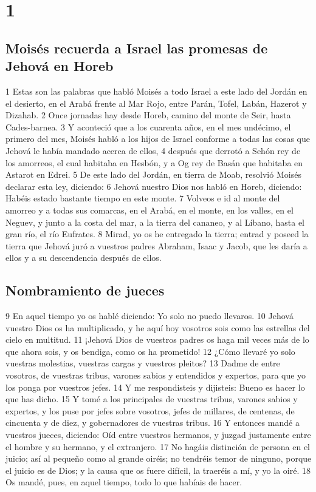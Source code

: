 
\chapter{1}




\section{Moisés recuerda a Israel las promesas de Jehová en Horeb}

1 Estas son las palabras que habló Moisés a todo Israel a este lado del Jordán en el desierto, en el Arabá frente al Mar Rojo, entre Parán, Tofel, Labán, Hazerot y Dizahab.
2 Once jornadas hay desde Horeb, camino del monte de Seir, hasta Cades-barnea.
3 Y aconteció que a los cuarenta años, en el mes undécimo, el primero del mes, Moisés habló a los hijos de Israel conforme a todas las cosas que Jehová le había mandado acerca de ellos,
4 después que derrotó a Sehón rey de los amorreos, el cual habitaba en Hesbón, y a Og rey de Basán que habitaba en Astarot en Edrei.
5 De este lado del Jordán, en tierra de Moab, resolvió Moisés declarar esta ley, diciendo:
6 Jehová nuestro Dios nos habló en Horeb, diciendo: Habéis estado bastante tiempo en este monte.
7 Volveos e id al monte del amorreo y a todas sus comarcas, en el Arabá, en el monte, en los valles, en el Neguev, y junto a la costa del mar, a la tierra del cananeo, y al Líbano, hasta el gran río, el río Eufrates.
8 Mirad, yo os he entregado la tierra; entrad y poseed la tierra que Jehová juró a vuestros padres Abraham, Isaac y Jacob, que les daría a ellos y a su descendencia después de ellos.

\section{Nombramiento de jueces }

9 En aquel tiempo yo os hablé diciendo: Yo solo no puedo llevaros.
10 Jehová vuestro Dios os ha multiplicado, y he aquí hoy vosotros sois como las estrellas del cielo en multitud.
11 ¡Jehová Dios de vuestros padres os haga mil veces más de lo que ahora sois, y os bendiga, como os ha prometido!
12 ¿Cómo llevaré yo solo vuestras molestias, vuestras cargas y vuestros pleitos?
13 Dadme de entre vosotros, de vuestras tribus, varones sabios y entendidos y expertos, para que yo los ponga por vuestros jefes.
14 Y me respondisteis y dijisteis: Bueno es hacer lo que has dicho.
15 Y tomé a los principales de vuestras tribus, varones sabios y expertos, y los puse por jefes sobre vosotros, jefes de millares, de centenas, de cincuenta y de diez, y gobernadores de vuestras tribus.
16 Y entonces mandé a vuestros jueces, diciendo: Oíd entre vuestros hermanos, y juzgad justamente entre el hombre y su hermano, y el extranjero.
17 No hagáis distinción de persona en el juicio; así al pequeño como al grande oiréis; no tendréis temor de ninguno, porque el juicio es de Dios; y la causa que os fuere difícil, la traeréis a mí, y yo la oiré.
18 Os mandé, pues, en aquel tiempo, todo lo que habíais de hacer.

